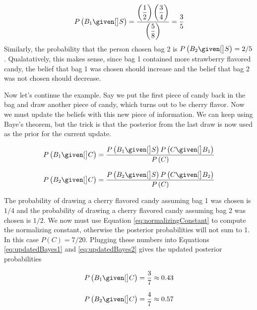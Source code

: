 \begin{equation}
	P \left( B_1 \given[\big] S \right) = \dfrac {\left( \dfrac {1} {2}\right) \left( \dfrac {3} {4}\right) } {\left( \dfrac {5} {8}\right) } = \frac{3}{5}
\end{equation}
Similarly, the probability that the person chosen bag 2 is $P \left( B_2 \given[\big] S \right) = 2/5$. Qualatatively, this makes sense, since bag 1 contained more strawberry flavored candy, the belief that bag 1 was chosen should increase and the belief that bag 2 was not chosen should decrease.

Now let's continue the example. Say we put the first piece of candy back in the bag and draw another piece of candy, which turns out to be cherry flavor. Now we must update the beliefs with this new piece of information. We can keep using Baye's theorem, but the trick is that the posterior from the last draw is now used as the prior for the current update.

\begin{equation}
	P \left( B_1 \given[\big] C \right) = \frac{ P \left( B_1 \given[\big] S \right) P \left( C \given[\big] B_1 \right) }{ P \left( C \right) }
\label{eq:updatedBayes1}
\end{equation}

\begin{equation}
	P \left( B_2 \given[\big] C \right) = \frac{ P \left( B_2 \given[\big] S \right) P \left( C \given[\big] B_2 \right) }{ P \left( C \right) }
\label{eq:updatedBayes2}
\end{equation}

The probability of drawing a cherry flavored candy assuming bag 1 was chosen is $ 1/4$ and the probability of drawing a cherry flavored candy assuming bag 2 was chosen is $1/2$. We now must use Equation \ref{eq:normalizingConstant} to compute the normalizing constant, otherwise the posterior probabilities will not sum to 1. In this case $ P(C) = 7/20 $. Plugging these numbers into Equations \ref{eq:updatedBayes1} and \ref{eq:updatedBayes2} gives the updated posterior probabilities

\begin{equation}
	P \left( B_1 \given[\big] C \right) = \frac{3}{7} \approx 0.43
\end{equation}

\begin{equation}
	P \left( B_2 \given[\big] C \right) = \frac{4}{7} \approx 0.57
\end{equation}

